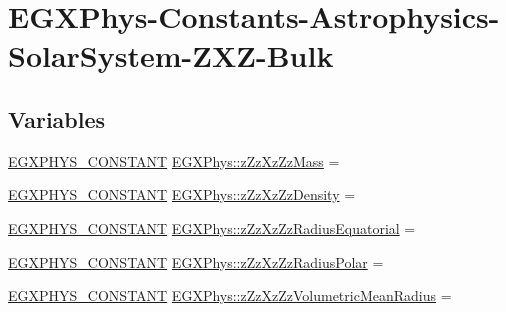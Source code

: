 \hypertarget{group___e_g_x_phys-_constants-_astrophysics-_solar_system-_z_x_z-_bulk}{}\section{E\+G\+X\+Phys-\/\+Constants-\/\+Astrophysics-\/\+Solar\+System-\/\+Z\+X\+Z-\/\+Bulk}
\label{group___e_g_x_phys-_constants-_astrophysics-_solar_system-_z_x_z-_bulk}
\subsection*{Variables}
\begin{DoxyCompactItemize}
\item 
\mbox{\hyperlink{group___e_g_x_phys-_constants-_macros_ga76980d288494ce1714c9ac68a95ba702}{E\+G\+X\+P\+H\+Y\+S\+\_\+\+C\+O\+N\+S\+T\+A\+NT}} \mbox{\hyperlink{group___e_g_x_phys-_constants-_astrophysics-_solar_system-_z_x_z-_bulk_ga8554bdc0f00df9945573f97fd6c1c684}{E\+G\+X\+Phys\+::z\+Zz\+Xz\+Zz\+Mass}} =
\item 
\mbox{\hyperlink{group___e_g_x_phys-_constants-_macros_ga76980d288494ce1714c9ac68a95ba702}{E\+G\+X\+P\+H\+Y\+S\+\_\+\+C\+O\+N\+S\+T\+A\+NT}} \mbox{\hyperlink{group___e_g_x_phys-_constants-_astrophysics-_solar_system-_z_x_z-_bulk_ga0faef5f87f29d7c42ea5d22364a9038f}{E\+G\+X\+Phys\+::z\+Zz\+Xz\+Zz\+Density}} =
\item 
\mbox{\hyperlink{group___e_g_x_phys-_constants-_macros_ga76980d288494ce1714c9ac68a95ba702}{E\+G\+X\+P\+H\+Y\+S\+\_\+\+C\+O\+N\+S\+T\+A\+NT}} \mbox{\hyperlink{group___e_g_x_phys-_constants-_astrophysics-_solar_system-_z_x_z-_bulk_ga3e41c59433f5c8418f0c23ea82326306}{E\+G\+X\+Phys\+::z\+Zz\+Xz\+Zz\+Radius\+Equatorial}} =
\item 
\mbox{\hyperlink{group___e_g_x_phys-_constants-_macros_ga76980d288494ce1714c9ac68a95ba702}{E\+G\+X\+P\+H\+Y\+S\+\_\+\+C\+O\+N\+S\+T\+A\+NT}} \mbox{\hyperlink{group___e_g_x_phys-_constants-_astrophysics-_solar_system-_z_x_z-_bulk_ga9b40c183940d2b9b9c0905edbdc3ed25}{E\+G\+X\+Phys\+::z\+Zz\+Xz\+Zz\+Radius\+Polar}} =
\item 
\mbox{\hyperlink{group___e_g_x_phys-_constants-_macros_ga76980d288494ce1714c9ac68a95ba702}{E\+G\+X\+P\+H\+Y\+S\+\_\+\+C\+O\+N\+S\+T\+A\+NT}} \mbox{\hyperlink{group___e_g_x_phys-_constants-_astrophysics-_solar_system-_z_x_z-_bulk_ga3a87b316b68dbefdd6a13d67d92f6e3e}{E\+G\+X\+Phys\+::z\+Zz\+Xz\+Zz\+Volumetric\+Mean\+Radius}} =

\end{DoxyCompactItemize}
